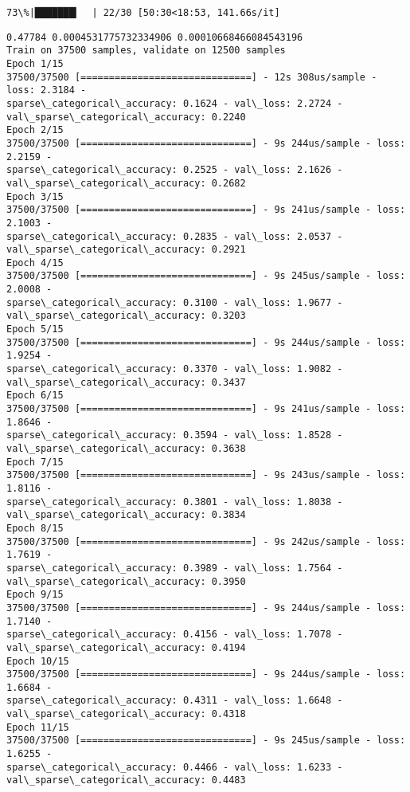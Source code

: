 \documentclass[11pt]{article}
\begin{document}
    \begin{Verbatim}[commandchars=\\\{\}]
 73\%|███████▎  | 22/30 [50:30<18:53, 141.66s/it]
    \end{Verbatim}

    \begin{Verbatim}[commandchars=\\\{\}]
0.47784 0.0004531775732334906 0.00010668466084543196
Train on 37500 samples, validate on 12500 samples
Epoch 1/15
37500/37500 [==============================] - 12s 308us/sample - loss: 2.3184 -
sparse\_categorical\_accuracy: 0.1624 - val\_loss: 2.2724 -
val\_sparse\_categorical\_accuracy: 0.2240
Epoch 2/15
37500/37500 [==============================] - 9s 244us/sample - loss: 2.2159 -
sparse\_categorical\_accuracy: 0.2525 - val\_loss: 2.1626 -
val\_sparse\_categorical\_accuracy: 0.2682
Epoch 3/15
37500/37500 [==============================] - 9s 241us/sample - loss: 2.1003 -
sparse\_categorical\_accuracy: 0.2835 - val\_loss: 2.0537 -
val\_sparse\_categorical\_accuracy: 0.2921
Epoch 4/15
37500/37500 [==============================] - 9s 245us/sample - loss: 2.0008 -
sparse\_categorical\_accuracy: 0.3100 - val\_loss: 1.9677 -
val\_sparse\_categorical\_accuracy: 0.3203
Epoch 5/15
37500/37500 [==============================] - 9s 244us/sample - loss: 1.9254 -
sparse\_categorical\_accuracy: 0.3370 - val\_loss: 1.9082 -
val\_sparse\_categorical\_accuracy: 0.3437
Epoch 6/15
37500/37500 [==============================] - 9s 241us/sample - loss: 1.8646 -
sparse\_categorical\_accuracy: 0.3594 - val\_loss: 1.8528 -
val\_sparse\_categorical\_accuracy: 0.3638
Epoch 7/15
37500/37500 [==============================] - 9s 243us/sample - loss: 1.8116 -
sparse\_categorical\_accuracy: 0.3801 - val\_loss: 1.8038 -
val\_sparse\_categorical\_accuracy: 0.3834
Epoch 8/15
37500/37500 [==============================] - 9s 242us/sample - loss: 1.7619 -
sparse\_categorical\_accuracy: 0.3989 - val\_loss: 1.7564 -
val\_sparse\_categorical\_accuracy: 0.3950
Epoch 9/15
37500/37500 [==============================] - 9s 244us/sample - loss: 1.7140 -
sparse\_categorical\_accuracy: 0.4156 - val\_loss: 1.7078 -
val\_sparse\_categorical\_accuracy: 0.4194
Epoch 10/15
37500/37500 [==============================] - 9s 244us/sample - loss: 1.6684 -
sparse\_categorical\_accuracy: 0.4311 - val\_loss: 1.6648 -
val\_sparse\_categorical\_accuracy: 0.4318
Epoch 11/15
37500/37500 [==============================] - 9s 245us/sample - loss: 1.6255 -
sparse\_categorical\_accuracy: 0.4466 - val\_loss: 1.6233 -
val\_sparse\_categorical\_accuracy: 0.4483

\end{Verbatim}
\end{document}
